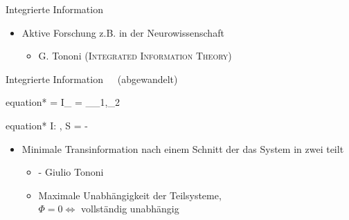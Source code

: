 \begin{frame}{Integrierte Information}
	\begin{itemize}
		\item{Aktive Forschung z.B. in der Neurowissenschaft}
		\begin{itemize}
			\item{G. Tononi (\textsc{Integrated Information Theory})\,\cite{Tononi_08}}
  		\end{itemize}
	\end{itemize}
	\begin{beamerboxesrounded}{Integrierte Information $\textcolor{white}{\Phi}$ (abgewandelt)}
		\begin{empheq}{equation*}
			\Phi = I_{} = \min_{\rho_1,\rho_2} \del{S(\rho_{1}) + S(\rho_{2}) - S(\rho)}
		\end{empheq}
		\vspace{-0.5cm}
		\begin{empheq}{equation*}
			\small I: , S = - 
		\end{empheq}
		\vspace{-0.5cm}
	\end{beamerboxesrounded}
	\begin{itemize}
		\item{Minimale Transinformation nach einem Schnitt der das System in zwei teilt}
			\begin{itemize}
				\item{ - Giulio Tononi}
				\item{Maximale Unabhängigkeit der Teilsysteme,\\ $\Phi = 0 \Leftrightarrow$ vollständig unabhängig}
			\end{itemize}
	\end{itemize}
\end{frame}